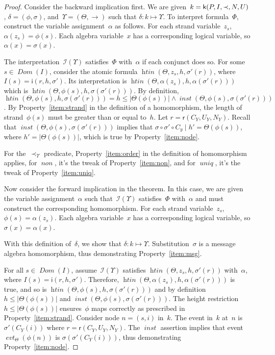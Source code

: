 \documentclass[titlepage,12pt]{article}
\newcommand{\fn}[1]{\ensuremath{\operatorname{\mathit{#1}}}}
\newcommand{\typ}{\mathbin:}
\newcommand{\sdom}{\fn{Dom}}
\newcommand{\prefix}[2]{#1\mid#2}
\newcommand{\interp}{\mathcal{I}}
\newcommand{\skel}{\mathsf{k}}
\newcommand{\insta}{\mathsf{i}}
\newcommand{\evt}{\fn{evt}}
\newcommand{\role}{\mathsf{r}}
\begin{document}
\begin{proof}
Consider the backward implication first.  We are
given~$k=\skel(P,I,\prec,\break N,U)$, $\delta=(\phi,\sigma)$,
and~$\Upsilon=(\Theta,\to)$ such that $\delta\typ
k\mapsto\Upsilon$. To interpret formula~$\Phi$, construct the variable
assignment~$\alpha$ as follows.  For each strand variable~$z_s$,
$\alpha(z_s)=\phi(s)$.  Each algebra variable~$x$ has a corresponding
logical variable, so $\alpha(x)=\sigma(x)$.

The interpretation~$\interp(\Upsilon)$ satisfies~$\Phi$ with~$\alpha$
if each conjunct does so.  For some $s\in\sdom(I)$, consider the
atomic formula $\fn{htin}(\Theta, z_s, h, \sigma'(r))$, where
$I(s)=\insta(r,h,\sigma')$.  Its interpretation is $\fn{htin}(\Theta,
\alpha(z_s), h, \alpha(\sigma'(r)))$ which is
$\fn{htin}(\Theta, \phi(s), h, \sigma(\sigma'(r)))$.  By
definition, $\fn{htin}(\Theta, \phi(s), h, \sigma
(\sigma'(r)))=h\leq|\Theta(\phi(s))|\wedge\fn{inst}(\Theta, \phi(s),
\sigma(\sigma'(r)))$.  By Property~\ref{item:strand} in the
definition of a homomorphism, the length of strand~$\phi(s)$ must be
greater than or equal to~$h$.  Let $r=\role(C_Y,U_Y,N_Y)$.  Recall
that $\fn{inst}(\Theta, \phi(s),\sigma(\sigma'(r)))$ implies
that $\sigma\circ\sigma'\circ\prefix{C_y}{h'}=\Theta(\phi(s))$, where
$h'=|\Theta(\phi(s))|$, which is true by Property~\ref{item:node}.

For the~$\prec_\Upsilon$ predicate, Property~\ref{item:order} in the
definition of homomorphism applies, for \fn{non}, it's the tweak of
Property~\ref{item:non}, and for \fn{uniq}, it's the tweak of
Property~\ref{item:uniq}.

Now consider the forward implication in the theorem.  In this case, we
are given the variable assignment~$\alpha$ such
that~$\interp(\Upsilon)$ satisfies~$\Phi$ with~$\alpha$ and must
construct the corresponding homomorphism.  For each strand
variable~$z_s$, $\phi(s)=\alpha(z_s)$.  Each algebra variable~$x$ has a
corresponding logical variable, so $\sigma(x)=\alpha(x)$.

With this definition of~$\delta$, we show that
$\delta\typ k\mapsto\Upsilon$.
Substitution~$\sigma$ is a message algebra homomorphism, thus
demonstrating Property~\ref{item:msg}.

\begin{sloppypar}
For all $s\in\sdom(I)$, assume~$\interp(\Upsilon)$ satisfies
$\fn{htin}(\Theta, z_s, h, \sigma'(r))$ with~$\alpha$, where
$I(s)=\insta(r,h,\sigma')$.  Therefore, $\fn{htin}(\Theta,
\alpha(z_s), h, \alpha(\sigma'(r)))$ is true, and so is
$\fn{htin}(\Theta, \phi(s), h, \sigma(\sigma'(r)))$ and by
definition $h\leq|\Theta(\phi(s))|$ and $\fn{inst}(\Theta,
\phi(s),\sigma(\sigma'(r)))$.  The height restriction
$h\leq|\Theta(\phi(s))|$ ensures~$\phi$ maps correctly as prescribed
in Property~\ref{item:strand}.  Consider node $n=(s,i)$ in~$k$.  The event
in~$k$ at~$n$ is~$\sigma'(C_Y(i))$ where $r=\role(C_Y,U_Y,N_Y)$.  The
\fn{inst} assertion implies that event $\evt_{\Theta}(\phi(n))$ is
$\sigma(\sigma'(C_Y(i)))$, thus demonstrating Property~\ref{item:node}.
\end{sloppypar}


\end{proof}
\end{document}
